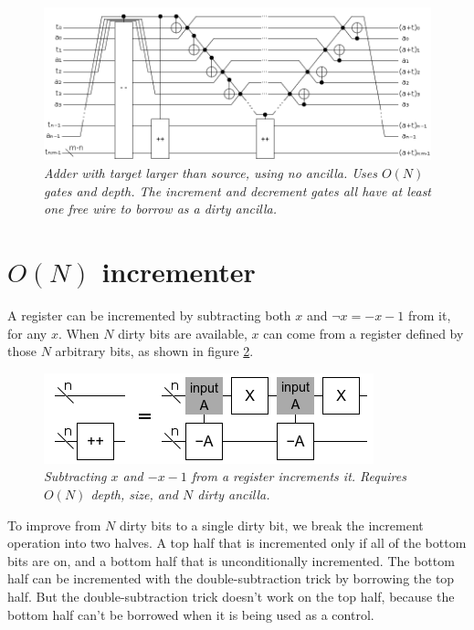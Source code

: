 \documentclass[twocolumn]{article}
\begin{document}
\begin{figure}
  \centering
  \includegraphics[totalheight=3cm]{inline-adder-into-large.png}
  \caption{\em
      Adder with target larger than source, using no ancilla.
      Uses $O(N)$ gates and depth.
      The increment and decrement gates all have at least one free wire to borrow as a dirty ancilla.}
  \label{fig:inline-adder-into-large}
\end{figure}

\section{$O(N)$ incrementer}

A register can be incremented by subtracting both $x$ and $\neg x = -x-1$ from it, for any $x$.
When $N$ dirty bits are available, $x$ can come from a register defined by those $N$ arbitrary bits, as shown in figure \ref{fig:double-sub-increment}.

\begin{figure}
  \centering
  \includegraphics[totalheight=2cm]{double-sub-increment.png}
  \caption{\em Subtracting $x$ and $-x-1$ from a register increments it. Requires $O(N)$ depth, size, and $N$ dirty ancilla.}
  \label{fig:double-sub-increment}
\end{figure}

To improve from $N$ dirty bits to a single dirty bit, we break the increment operation into two halves.
A top half that is incremented only if all of the bottom bits are on, and a bottom half that is unconditionally incremented.
The bottom half can be incremented with the double-subtraction trick by borrowing the top half.
But the double-subtraction trick doesn't work on the top half, because the bottom half can't be borrowed when it is being used as a control.
\end{document}
